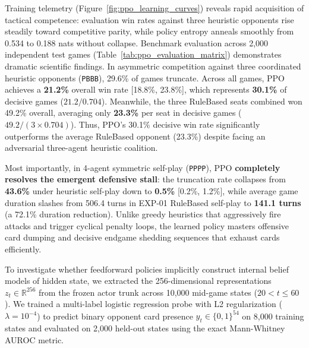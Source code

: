 \documentclass[journal]{IEEEtran}
\begin{document}
Training telemetry (Figure~\ref{fig:ppo_learning_curves}) reveals rapid acquisition of tactical competence: evaluation win rates against three heuristic opponents rise steadily toward competitive parity, while policy entropy anneals smoothly from 0.534 to 0.188 nats without collapse. Benchmark evaluation across 2,000 independent test games (Table~\ref{tab:ppo_evaluation_matrix}) demonstrates dramatic scientific findings. In asymmetric competition against three coordinated heuristic opponents (\texttt{PBBB}), 29.6\% of games truncate. Across all games, PPO achieves a \textbf{21.2\%} overall win rate [18.8\%, 23.8\%], which represents \textbf{30.1\%} of decisive games ($21.2 / 0.704$). Meanwhile, the three RuleBased seats combined won 49.2\% overall, averaging only \textbf{23.3\%} per seat in decisive games ($49.2 / (3 \times 0.704)$). Thus, PPO's 30.1\% decisive win rate significantly outperforms the average RuleBased opponent (23.3\%) despite facing an adversarial three-agent heuristic coalition. 

Most importantly, in 4-agent symmetric self-play (\texttt{PPPP}), PPO \textbf{completely resolves the emergent defensive stall}: the truncation rate collapses from \textbf{43.6\%} under heuristic self-play down to \textbf{0.5\%} [0.2\%, 1.2\%], while average game duration slashes from 506.4 turns in EXP-01 RuleBased self-play to \textbf{141.1 turns} (a 72.1\% duration reduction). Unlike greedy heuristics that aggressively fire attacks and trigger cyclical penalty loops, the learned policy masters offensive card dumping and decisive endgame shedding sequences that exhaust cards efficiently.

To investigate whether feedforward policies implicitly construct internal belief models of hidden state, we extracted the 256-dimensional representations $z_t \in \mathbb{R}^{256}$ from the frozen actor trunk across 10,000 mid-game states ($20 < t \le 60$). We trained a multi-label logistic regression probe with L2 regularization ($\lambda = 10^{-4}$) to predict binary opponent card presence $y_t \in \{0, 1\}^{54}$ on 8,000 training states and evaluated on 2,000 held-out states using the exact Mann-Whitney AUROC metric.
\end{document}
